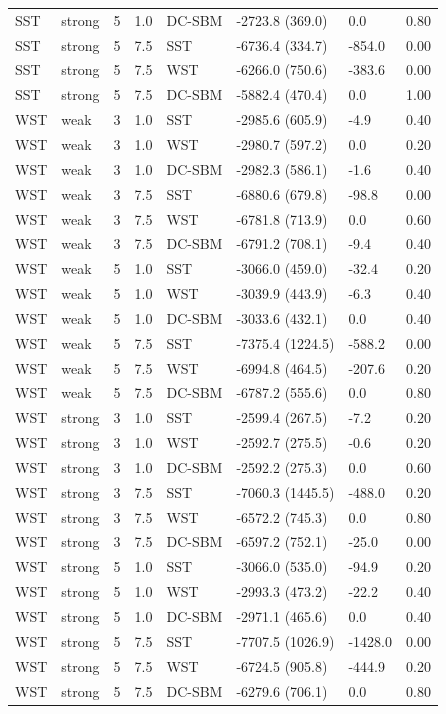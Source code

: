 \begin{table}
\begin{tabular}[t]{llrrllll}
SST & strong & 5 & 1.0 & DC-SBM & -2723.8 (369.0) & 0.0 & 0.80\\
SST & strong & 5 & 7.5 & SST & -6736.4 (334.7) & -854.0 & 0.00\\
SST & strong & 5 & 7.5 & WST & -6266.0 (750.6) & -383.6 & 0.00\\
SST & strong & 5 & 7.5 & DC-SBM & -5882.4 (470.4) & 0.0 & 1.00\\
WST & weak & 3 & 1.0 & SST & -2985.6 (605.9) & -4.9 & 0.40\\
\addlinespace
WST & weak & 3 & 1.0 & WST & -2980.7 (597.2) & 0.0 & 0.20\\
WST & weak & 3 & 1.0 & DC-SBM & -2982.3 (586.1) & -1.6 & 0.40\\
WST & weak & 3 & 7.5 & SST & -6880.6 (679.8) & -98.8 & 0.00\\
WST & weak & 3 & 7.5 & WST & -6781.8 (713.9) & 0.0 & 0.60\\
WST & weak & 3 & 7.5 & DC-SBM & -6791.2 (708.1) & -9.4 & 0.40\\
\addlinespace
WST & weak & 5 & 1.0 & SST & -3066.0 (459.0) & -32.4 & 0.20\\
WST & weak & 5 & 1.0 & WST & -3039.9 (443.9) & -6.3 & 0.40\\
WST & weak & 5 & 1.0 & DC-SBM & -3033.6 (432.1) & 0.0 & 0.40\\
WST & weak & 5 & 7.5 & SST & -7375.4 (1224.5) & -588.2 & 0.00\\
WST & weak & 5 & 7.5 & WST & -6994.8 (464.5) & -207.6 & 0.20\\
\addlinespace
WST & weak & 5 & 7.5 & DC-SBM & -6787.2 (555.6) & 0.0 & 0.80\\
WST & strong & 3 & 1.0 & SST & -2599.4 (267.5) & -7.2 & 0.20\\
WST & strong & 3 & 1.0 & WST & -2592.7 (275.5) & -0.6 & 0.20\\
WST & strong & 3 & 1.0 & DC-SBM & -2592.2 (275.3) & 0.0 & 0.60\\
WST & strong & 3 & 7.5 & SST & -7060.3 (1445.5) & -488.0 & 0.20\\
\addlinespace
WST & strong & 3 & 7.5 & WST & -6572.2 (745.3) & 0.0 & 0.80\\
WST & strong & 3 & 7.5 & DC-SBM & -6597.2 (752.1) & -25.0 & 0.00\\
WST & strong & 5 & 1.0 & SST & -3066.0 (535.0) & -94.9 & 0.20\\
WST & strong & 5 & 1.0 & WST & -2993.3 (473.2) & -22.2 & 0.40\\
WST & strong & 5 & 1.0 & DC-SBM & -2971.1 (465.6) & 0.0 & 0.40\\
\addlinespace
WST & strong & 5 & 7.5 & SST & -7707.5 (1026.9) & -1428.0 & 0.00\\
WST & strong & 5 & 7.5 & WST & -6724.5 (905.8) & -444.9 & 0.20\\
WST & strong & 5 & 7.5 & DC-SBM & -6279.6 (706.1) & 0.0 & 0.80\\
\bottomrule
\end{tabular}
\end{table}
